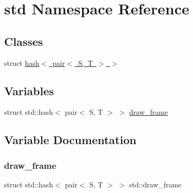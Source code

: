 \hypertarget{namespacestd}{}\section{std Namespace Reference}
\label{namespacestd}
\subsection*{Classes}
\begin{DoxyCompactItemize}
\item 
struct \mbox{\hyperlink{structstd_1_1hash_3_01pair_3_01S_00_01T_01_4_01_4}{hash$<$ pair$<$ S, T $>$ $>$}}
\end{DoxyCompactItemize}
\subsection*{Variables}
\begin{DoxyCompactItemize}
\item 
struct std\+::hash$<$ pair$<$ S, T $>$ $>$ \mbox{\hyperlink{namespacestd_a0dc59575a8304dc28c74f9641fefdeee}{draw\+\_\+frame}}
\end{DoxyCompactItemize}


\subsection{Variable Documentation}
\mbox{\label{namespacestd_a0dc59575a8304dc28c74f9641fefdeee}} 
\subsubsection{\texorpdfstring{draw\+\_\+frame}{draw\_frame}}
{\footnotesize\ttfamily struct std\+::hash$<$ pair$<$ S, T $>$ $>$ std\+::draw\+\_\+frame}

